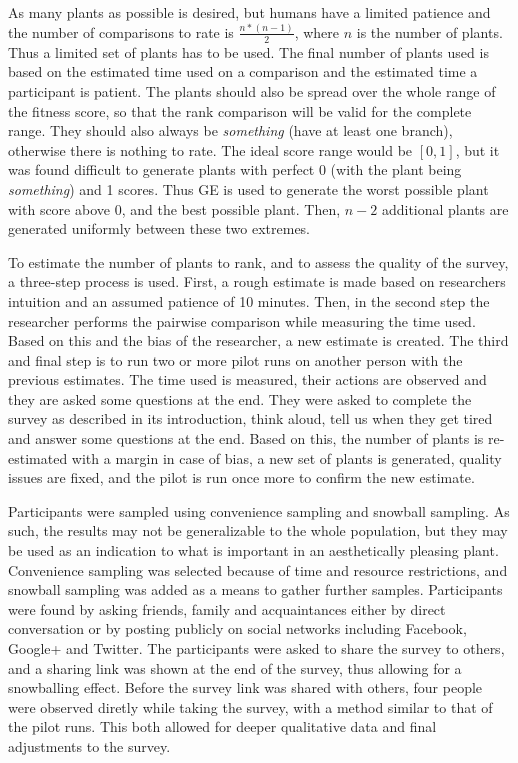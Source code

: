 As many plants as possible is desired, but humans have a limited patience and the number of comparisons to rate is $\frac{n * (n - 1)}{2}$, where $n$ is the number of plants.
Thus a limited set of plants has to be used.
The final number of plants used is based on the estimated time used on a comparison and the estimated time a participant is patient.
The plants should also be spread over the whole range of the fitness score, so that the rank comparison will be valid for the complete range.
They should also always be \textit{something} (have at least one branch), otherwise there is nothing to rate.
The ideal score range would be $[0, 1]$, but it was found difficult to generate plants with perfect 0 (with the plant being \textit{something}) and 1 scores.
Thus \gls{GE} is used to generate the worst possible plant with score above 0, and the best possible plant.
Then, $n - 2$ additional plants are generated uniformly between these two extremes.


To estimate the number of plants to rank, and to assess the quality of the survey, a three-step process is used.
First, a rough estimate is made based on researchers intuition and an assumed patience of 10 minutes.
Then, in the second step the researcher performs the pairwise comparison while measuring the time used.
Based on this and the bias of the researcher, a new estimate is created.
The third and final step is to run two or more pilot runs on another person with the previous estimates.
The time used is measured, their actions are observed and they are asked some questions at the end.
They were asked to complete the survey as described in its introduction, think aloud, tell us when they get tired and answer some questions at the end.
Based on this, the number of plants is re-estimated with a margin in case of bias, a new set of plants is generated, quality issues are fixed, and the pilot is run once more to confirm the new estimate.

Participants were sampled using convenience sampling and snowball sampling.
As such, the results may not be generalizable to the whole population, but they may be used as an indication to what is important in an aesthetically pleasing plant.
Convenience sampling was selected because of time and resource restrictions, and snowball sampling was added as a means to gather further samples.
Participants were found by asking friends, family and acquaintances either by direct conversation or by posting publicly on social networks including Facebook, Google+ and Twitter.
The participants were asked to share the survey to others, and a sharing link was shown at the end of the survey, thus allowing for a snowballing effect.
Before the survey link was shared with others, four people were observed diretly while taking the survey, with a method similar to that of the pilot runs.
This both allowed for deeper qualitative data and final adjustments to the survey.

